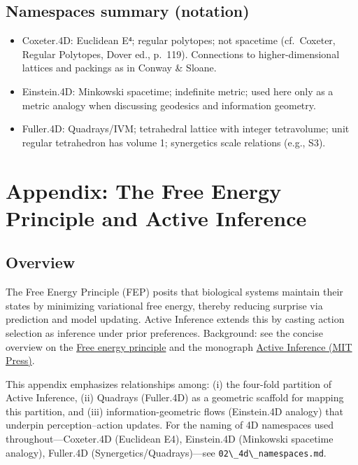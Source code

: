 \documentclass[
  10pt,
]{article}
\newcommand{\passthrough}[1]{#1}
\providecommand{\tightlist}{%
  \setlength{\itemsep}{0pt}\setlength{\parskip}{0pt}}
\begin{document}
\hypertarget{namespaces-summary-notation}{%
\subsection{Namespaces summary
(notation)}\label{namespaces-summary-notation}}

\begin{itemize}
\tightlist
\item
  Coxeter.4D: Euclidean E⁴; regular polytopes; not spacetime
  (cf.~Coxeter, Regular Polytopes, Dover ed., p.~119). Connections to
  higher-dimensional lattices and packings as in Conway \& Sloane.
\item
  Einstein.4D: Minkowski spacetime; indefinite metric; used here only as
  a metric analogy when discussing geodesics and information geometry.
\item
  Fuller.4D: Quadrays/IVM; tetrahedral lattice with integer tetravolume;
  unit regular tetrahedron has volume 1; synergetics scale relations
  (e.g., S3).
\end{itemize}

\newpage

\hypertarget{appendix-the-free-energy-principle-and-active-inference}{%
\section{Appendix: The Free Energy Principle and Active
Inference}\label{appendix-the-free-energy-principle-and-active-inference}}

\hypertarget{overview-3}{%
\subsection{Overview}\label{overview-3}}

The Free Energy Principle (FEP) posits that biological systems maintain
their states by minimizing variational free energy, thereby reducing
surprise via prediction and model updating. Active Inference extends
this by casting action selection as inference under prior preferences.
Background: see the concise overview on the
\href{https://en.wikipedia.org/wiki/Free_energy_principle}{Free energy
principle} and the monograph
\href{https://direct.mit.edu/books/oa-monograph/5299/Active-InferenceThe-Free-Energy-Principle-in-Mind}{Active
Inference (MIT Press)}.

This appendix emphasizes relationships among: (i) the four-fold
partition of Active Inference, (ii) Quadrays (Fuller.4D) as a geometric
scaffold for mapping this partition, and (iii) information-geometric
flows (Einstein.4D analogy) that underpin perception--action updates.
For the naming of 4D namespaces used throughout---Coxeter.4D (Euclidean
E4), Einstein.4D (Minkowski spacetime analogy), Fuller.4D
(Synergetics/Quadrays)---see
\passthrough{\lstinline!02\_4d\_namespaces.md!}.
\end{document}
